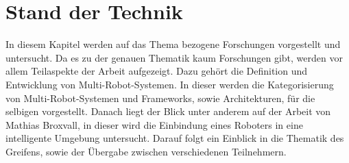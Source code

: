 \section{Stand der Technik}
\label{sec:relatedwork}

In diesem Kapitel werden auf das Thema bezogene Forschungen vorgestellt und untersucht. Da es zu der genauen Thematik kaum Forschungen gibt, werden vor allem Teilaspekte der Arbeit aufgezeigt. Dazu gehört die Definition und Entwicklung von Multi-Robot-Systemen. In dieser werden die Kategorisierung von Multi-Robot-Systemen und Frameworks, sowie Architekturen, für die selbigen vorgestellt. Danach liegt der Blick unter anderem auf der Arbeit von Mathias Broxvall, in dieser wird die Einbindung eines Roboters in eine intelligente Umgebung untersucht. Darauf folgt ein Einblick in die Thematik des Greifens, sowie der Übergabe zwischen verschiedenen Teilnehmern.





